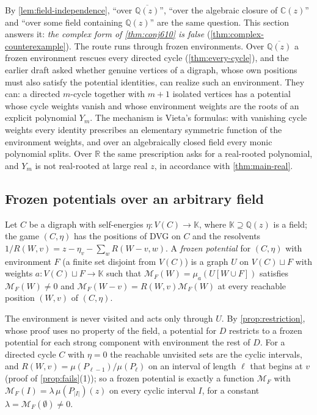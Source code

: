 \documentclass[final]{siamart0516}
\numberwithin{theorem}{section}
\numberwithin{equation}{section}
\theoremstyle{siamnonum}
\theoremstyle{plain}
\newcommand{\QQ}{\mathbb{Q}}
\newcommand{\RR}{\mathbb{R}}
\newcommand{\CC}{\mathbb{C}}
\newcommand{\Qz}{\QQ(z)}
\newcommand{\Qzbar}{\overline{\QQ(z)}}
\newcommand{\Mpot}{\mathcal{M}}           %
\begin{document}
By \cref{lem:field-independence}, ``over $\Qzbar$'', ``over the algebraic closure of $\CC(z)$'' and ``over some field containing $\Qz$'' are the same question. This section answers it: \emph{the complex form of \cref{thm:conj610} is false} (\cref{thm:complex-counterexample}). The route runs through frozen environments. Over $\Qzbar$ a frozen environment rescues every directed cycle (\cref{thm:every-cycle}), and the earlier draft asked whether genuine vertices of a digraph, whose own positions must also satisfy the potential identities, can realize such an environment. They can: a directed $m$-cycle together with $m+1$ isolated vertices has a potential whose cycle weights vanish and whose environment weights are the roots of an explicit polynomial $Y_m$. The mechanism is Vieta's formulas: with vanishing cycle weights every identity prescribes an elementary symmetric function of the environment weights, and over an algebraically closed field every monic polynomial splits. Over $\RR$ the same prescription asks for a real-rooted polynomial, and $Y_m$ is not real-rooted at large real $z$, in accordance with \cref{thm:main-real}.

\subsection{Frozen potentials over an arbitrary field}

\begin{definition}\label{def:frozen}
Let $C$ be a digraph with self-energies $\eta\colon V(C)\to\mathbb K$, where $\mathbb K\supseteq\Qz$ is a field; the game $(C,\eta)$ has the positions of DVG on $C$ and the resolvents $1/R(W,v)=z-\eta_v-\sum_{w}R(W-v,w)$. A \emph{frozen potential} for $(C,\eta)$ with environment $F$ (a finite set disjoint from $V(C)$) is a graph $U$ on $V(C)\sqcup F$ with weights $a\colon V(C)\sqcup F\to\mathbb K$ such that $\Mpot_F(W)=\mu_a(U[W\cup F])$ satisfies $\Mpot_F(W)\neq0$ and $\Mpot_F(W-v)=R(W,v)\Mpot_F(W)$ at every reachable position $(W,v)$ of $(C,\eta)$.
\end{definition}

The environment is never visited and acts only through $U$. By \cref{prop:restriction}, whose proof uses no property of the field, a potential for $D$ restricts to a frozen potential for each strong component with environment the rest of $D$. For a directed cycle $C$ with $\eta=0$ the reachable unvisited sets are the cyclic intervals, and $R(W,v)=\mu(P_{\ell-1})/\mu(P_\ell)$ on an interval of length $\ell$ that begins at $v$ (proof of \cref{prop:fails}(1)); so a frozen potential is exactly a function $\Mpot_F$ with $\Mpot_F(I)=\lambda\,\mu(P_{|I|})(z)$ on every cyclic interval $I$, for a constant $\lambda=\Mpot_F(\emptyset)\neq0$.
\end{document}
